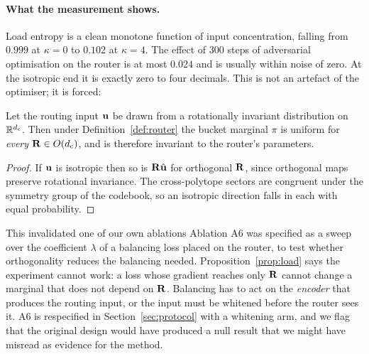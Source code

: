 \begin{table}[h]
\centering
\small

\caption{Load entropy against input anisotropy $\kappa$, before and after 300 steps of explicit collapse pressure on the rotation ($\dc=16$, $B=32$, $n=8192$). The load is determined almost entirely by $\kappa$; the pressure moves it by at most $0.024$.}
\label{tab:s3}
\end{table}

\paragraph{What the measurement shows.} Load entropy is a clean monotone function of input concentration, falling from $0.999$ at $\kappa=0$ to $0.102$ at $\kappa=4$. The effect of 300 steps of adversarial optimisation on the router is at most $0.024$ and is usually within noise of zero. At the isotropic end it is exactly zero to four decimals. This is not an artefact of the optimiser; it is forced:

\begin{proposition}
\label{prop:load}
Let the routing input $\mathbf{u}$ be drawn from a rotationally invariant distribution on $\mathbb{R}^{d_{\mathrm{c}}}$. Then under Definition~\ref{def:router} the bucket marginal $\pi$ is uniform for \emph{every} $\mathbf{R} \in O(d_{\mathrm{c}})$, and is therefore invariant to the router's parameters.
\end{proposition}
\begin{proof}
If $\mathbf{u}$ is isotropic then so is $\mathbf{R}\hat{\mathbf{u}}$ for orthogonal $\mathbf{R}$, since orthogonal maps preserve rotational invariance. The cross-polytope sectors are congruent under the symmetry group of the codebook, so an isotropic direction falls in each with equal probability.
\end{proof}

\begin{revision}{This invalidated one of our own ablations}
Ablation A6 was specified as a sweep over the coefficient $\lambda$ of a balancing loss placed on the router, to test whether orthogonality reduces the balancing needed. Proposition~\ref{prop:load} says the experiment cannot work: a loss whose gradient reaches only $\mathbf{R}$ cannot change a marginal that does not depend on $\mathbf{R}$. Balancing has to act on the \emph{encoder} that produces the routing input, or the input must be whitened before the router sees it. A6 is respecified in Section~\ref{sec:protocol} with a whitening arm, and we flag that the original design would have produced a null result that we might have misread as evidence for the method.
\end{revision}

